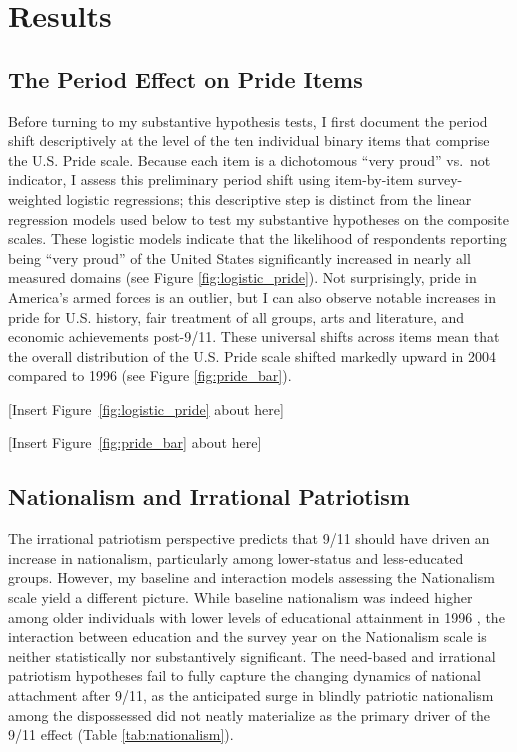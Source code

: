 \documentclass[12pt,letterpaper]{article}
\begin{document}
\section{Results}

\subsection{The Period Effect on Pride Items}

Before turning to my substantive hypothesis tests, I first document the period shift descriptively at the level of the ten individual binary items that comprise the U.S. Pride scale. Because each item is a dichotomous ``very proud'' vs.\ not indicator, I assess this preliminary period shift using item-by-item survey-weighted logistic regressions; this descriptive step is distinct from the linear regression models used below to test my substantive hypotheses on the composite scales. These logistic models indicate that the likelihood of respondents reporting being ``very proud'' of the United States significantly increased in nearly all measured domains (see Figure \ref{fig:logistic_pride}). Not surprisingly, pride in America's armed forces is an outlier, but I can also observe notable increases in pride for U.S. history, fair treatment of all groups, arts and literature, and economic achievements post-9/11. These universal shifts across items mean that the overall distribution of the U.S. Pride scale shifted markedly upward in 2004 compared to 1996 (see Figure \ref{fig:pride_bar}).

[Insert Figure~\ref{fig:logistic_pride} about here]

[Insert Figure~\ref{fig:pride_bar} about here]

\subsection{Nationalism and Irrational Patriotism}

The irrational patriotism perspective predicts that 9/11 should have driven an increase in nationalism, particularly among lower-status and less-educated groups. However, my baseline and interaction models assessing the Nationalism scale yield a different picture. While baseline nationalism was indeed higher among older individuals with lower levels of educational attainment in 1996 \citep{jost2003social-206}, the interaction between education and the survey year on the Nationalism scale is neither statistically nor substantively significant. The need-based and irrational patriotism hypotheses fail to fully capture the changing dynamics of national attachment after 9/11, as the anticipated surge in blindly patriotic nationalism among the dispossessed did not neatly materialize as the primary driver of the 9/11 effect (Table \ref{tab:nationalism}).
\end{document}
